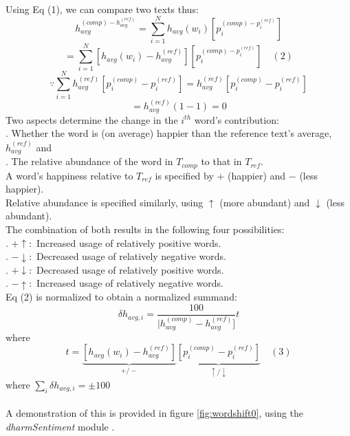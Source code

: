 \documentclass[journal, a4paper]{IEEEtran}
\begin{document}
\\Using Eq (1), we can compare two texts thus:
\[h_{avg}^{(comp) - h_{avg}^{(ref)}}= \sum_{i=1}^{N}h_{avg}(w_i)[p_i^{(comp) - p_i^{(ref)}}]\]
\[= \sum_{i=1}^{N}[h_{avg}(w_i) - h_{avg}^{(ref)}][p_i^{(comp) - p_i^{(ref)}}] \quad (2)\]
\[\because \sum_{i=1}^{N}h_{avg}^{(ref)}[p_i^{(comp)} - p_i^{(ref)}] = h_{avg}^{(ref)}[p_i^{(comp)} - p_i^{(ref)}]\]
\[= h_{avg}^{(ref)}(1-1) = 0\]
Two aspects determine the change in the $i^{th}$ word's contribution:
\\\null\quad{}. Whether the word is (on average) happier than the reference text's average, $h_{avg}^{(ref)}$ and
\\\null\quad{}. The relative abundance of the word in $T_{comp}$ to that in $T_{ref}$.
\\A word's happiness relative to $T_{ref}$ is specified by $+$ (happier) and $-$ (less happier).
\\Relative abundance is specified similarly, using $\uparrow$ (more abundant) and $\downarrow$ (less abundant).
\\The combination of both results in the following four possibilities:
\\\null\quad{}. $+\uparrow:$ Increased usage of relatively positive words.
\\\null\quad{}. $-\downarrow:$ Decreased usage of relatively negative words.
\\\null\quad{}. $+\downarrow:$ Decreased usage of relatively positive words.
\\\null\quad{}. $-\uparrow:$ Increased usage of relatively negative words.
\\Eq (2) is normalized to obtain a normalized summand:
\[\delta h_{avg,i} = \frac{100}{|h_{avg}^{(comp)} - h_{avg}^{(ref)}]} t\]
where \[t = \underbrace{[h_{avg}(w_i) - h_{avg}^{(ref)}]}_{+/-} \underbrace{[p_{i}^{(comp)} - p_{i}^{(ref)}]}_{\uparrow/\downarrow} \quad(3)\]
where $\sum_{i}\delta h_{avg,i} = \pm100$
\\\\A demonstration of this is provided in figure \ref{fig:wordshift0}, using the \textit{dharmSentiment} module \cite{dharmsentiment}.
\end{document}
